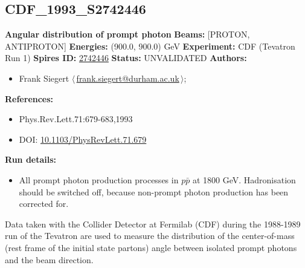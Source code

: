 \subsection[CDF\_1993\_S2742446]{CDF\_1993\_S2742446\,\cite{Abe:1993cv}}
\textbf{Angular distribution of prompt photon}\newline
\textbf{Beams:} [PROTON, ANTIPROTON] \newline
\textbf{Energies:} (900.0, 900.0) GeV \newline
\textbf{Experiment:} CDF (Tevatron Run 1) \newline
\textbf{Spires ID:} \href{http://www.slac.stanford.edu/spires/find/hep/www?rawcmd=key+2742446}{2742446}\newline
\textbf{Status:} UNVALIDATED\newline
\textbf{Authors:}
\begin{itemize}
  \item Frank Siegert $\langle\,$\href{mailto:frank.siegert@durham.ac.uk}{frank.siegert@durham.ac.uk}$\,\rangle$;
\end{itemize}
\textbf{References:}
\begin{itemize}
  \item Phys.Rev.Lett.71:679-683,1993
  \item DOI: \href{http://dx.doi.org/10.1103/PhysRevLett.71.679}{10.1103/PhysRevLett.71.679}
\end{itemize}
\textbf{Run details:}
\begin{itemize}

  \item All prompt photon production processes in $p \bar{p}$ at 1800 GeV. Hadronisation should be switched off, because non-prompt photon production has been corrected for.\end{itemize}

\noindent Data taken with the Collider Detector at Fermilab (CDF) during the 1988-1989 run of the Tevatron are used to measure the distribution of the center-of-mass (rest frame of the initial state partons) angle between isolated prompt photons and the beam direction.

\clearpage


\clearpage

